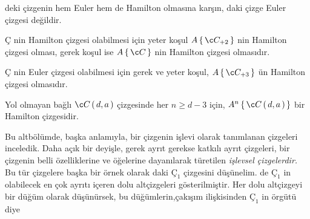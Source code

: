 \documentclass[11pt]{amsbook}
\begin{document}

 deki çizgenin hem Euler hem de Hamilton olmasına karşın,  daki çizge Euler çizgesi değildir. 
\begin{theorem}
	$Ç$ nin Hamilton çizgesi olabilmesi için yeter koşul $A \hPairingCurly{Ç_{+2}}$ nin Hamilton çizgesi olması, gerek koşul ise $A \hPairingCurly{Ç}$ nin Hamilton çizgesi olmasıdır. 
\end{theorem}
\begin{theorem}
	$Ç$ nin Euler çizgesi olabilmesi için gerek ve yeter koşul, $A \hPairingCurly{Ç_{+3}}$ ün Hamilton çizgesi olmasıdır. 
\end{theorem}
\begin{theorem}
	Yol olmayan bağlı $Ç\hPairingParan{d,a}$ çizgesinde her $n\geq d-3$ için, $A^n\hPairingCurly{Ç\hPairingParan{d,a}}$ bir Hamilton çizgesidir.
\end{theorem}
Bu altbölümde, başka anlamıyla, bir çizgenin işlevi olarak tanımlanan çizgeleri inceledik. Daha açık bir deyişle, gerek ayrıt gerekse katkılı ayrıt çizgeleri, bir çizgenin belli özelliklerine ve öğelerine dayanılarak türetilen \emph{işlevsel çizgelerdir.} Bu tür çizgelere başka bir örnek olarak  daki $Ç_1$ çizgesini düşünelim.   de $Ç_1$ in olabilecek en çok ayrıtı içeren dolu altçizgeleri gösterilmiştir. Her dolu altçizgeyi bir düğüm olarak düşünürsek, bu düğümlerin,çakışım ilişkisinden $Ç_1$ in örgütü diye 
\end{document}
